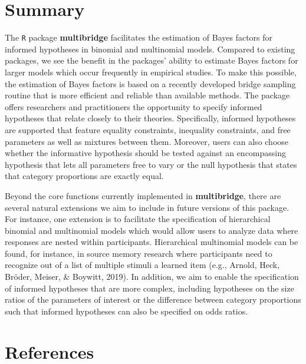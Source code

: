 \documentclass[
  english,
  man,floatsintext]{apa6}
\begin{document}
\hypertarget{summary}{%
\section{Summary}\label{summary}}

The \texttt{R} package \textbf{multibridge} facilitates the estimation of Bayes factors for informed hypotheses in binomial and multinomial models. Compared to existing packages, we see the benefit in the packages' ability to estimate Bayes factors for larger models which occur frequently in empirical studies. To make this possible, the estimation of Bayes factors is based on a recently developed bridge sampling routine that is more efficient and reliable than available methods. The package offers researchers and practitioners the opportunity to specify informed hypotheses that relate closely to their theories. Specifically, informed hypotheses are supported that feature equality constraints, inequality constraints, and free parameters as well as mixtures between them. Moreover, users can also choose whether the informative hypothesis should be tested against an encompassing hypothesis that lets all parameters free to vary or the null hypothesis that states that category proportions are exactly equal.

Beyond the core functions currently implemented in \textbf{multibridge}, there are several natural extensions we aim to include in future versions of this package. For instance, one extension is to facilitate the specification of hierarchical binomial and multinomial models which would allow users to analyze data where responses are nested within participants. Hierarchical multinomial models can be found, for instance, in source memory research where participants need to recognize out of a list of multiple stimuli a learned item (e.g., Arnold, Heck, Bröder, Meiser, \& Boywitt, 2019). In addition, we aim to enable the specification of informed hypotheses that are more complex, including hypotheses on the size ratios of the parameters of interest or the difference between category proportions such that informed hypotheses can also be specified on odds ratios.

\clearpage

\hypertarget{references}{%
\section{References}\label{references}}

\begingroup
\setlength{\parindent}{-0.5in}
\setlength{\leftskip}{0.5in}
\end{document}
